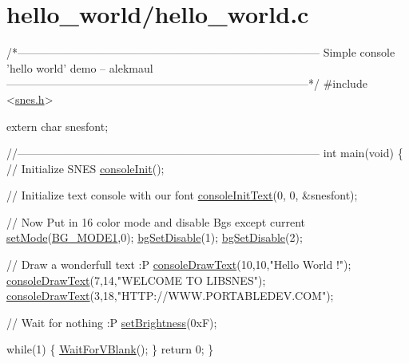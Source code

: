 \hypertarget{a00391}{}\section{hello\+\_\+world/hello\+\_\+world.\+c}

\begin{DoxyCodeInclude}
\textcolor{comment}{/*---------------------------------------------------------------------------------}
\textcolor{comment}{}
\textcolor{comment}{}
\textcolor{comment}{    Simple console 'hello world' demo}
\textcolor{comment}{    -- alekmaul}
\textcolor{comment}{}
\textcolor{comment}{}
\textcolor{comment}{---------------------------------------------------------------------------------*/}
\textcolor{preprocessor}{#include <\hyperlink{a00359}{snes.h}>}

\textcolor{keyword}{extern} \textcolor{keywordtype}{char} snesfont;

\textcolor{comment}{//---------------------------------------------------------------------------------}
\textcolor{keywordtype}{int} main(\textcolor{keywordtype}{void}) \{
    \textcolor{comment}{// Initialize SNES }
    \hyperlink{a00323_a6047713bb5a73afd3cd1d77e336bcdad}{consoleInit}();
    
    \textcolor{comment}{// Initialize text console with our font}
    \hyperlink{a00323_a458fa049800e12429ca0ba401e513746}{consoleInitText}(0, 0, &snesfont);

    \textcolor{comment}{// Now Put in 16 color mode and disable Bgs except current}
    \hyperlink{a00356_afd9e46ae627d055dd8c98a4b0ebb73b1}{setMode}(\hyperlink{a00320_a05c862edb7f8f75036f10c04dcc3c2a6}{BG\_MODE1},0);  \hyperlink{a00320_a4dbfb1b8854ff9ca4a7d11a899281bbb}{bgSetDisable}(1);  
      \hyperlink{a00320_a4dbfb1b8854ff9ca4a7d11a899281bbb}{bgSetDisable}(2);

    \textcolor{comment}{// Draw a wonderfull text :P}
    \hyperlink{a00323_a7e52d15b5a1befa42f5758de19dfb70c}{consoleDrawText}(10,10,\textcolor{stringliteral}{"Hello World !"});
    \hyperlink{a00323_a7e52d15b5a1befa42f5758de19dfb70c}{consoleDrawText}(7,14,\textcolor{stringliteral}{"WELCOME TO LIBSNES"});
    \hyperlink{a00323_a7e52d15b5a1befa42f5758de19dfb70c}{consoleDrawText}(3,18,\textcolor{stringliteral}{"HTTP://WWW.PORTABLEDEV.COM"});

    \textcolor{comment}{// Wait for nothing :P}
    \hyperlink{a00356_a4c257abebd75e4653441e8afe672bb5e}{setBrightness}(0xF);  
    
    \textcolor{keywordflow}{while}(1) \{
        \hyperlink{a00329_a815e2626bd26d0e936d507a363ecd723}{WaitForVBlank}();
    \}
    \textcolor{keywordflow}{return} 0;
\}
\end{DoxyCodeInclude}
 